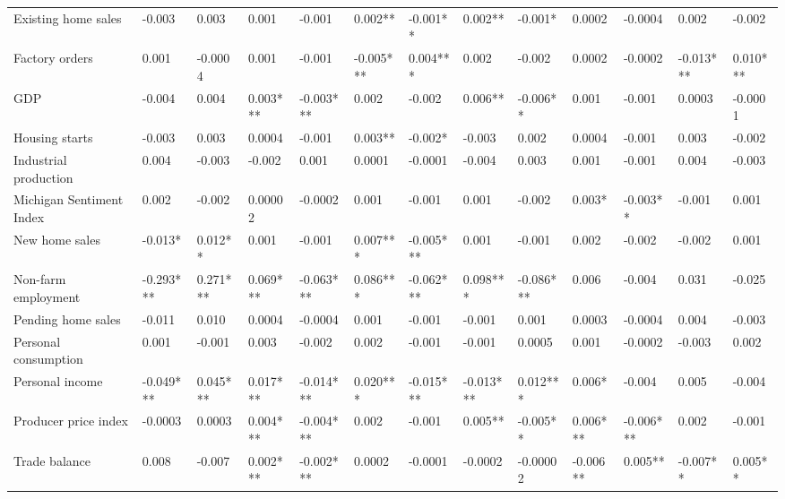 \begin{landscape}
\begin{table}[]
{\begin{tabular}{lllllllllllll}
Existing home sales      & -0.003    & 0.003    & 0.001    & -0.001    & 0.002**   & -0.001**  & 0.002**   & -0.001*   & 0.0002   & -0.0004   & 0.002     & -0.002   \\
Factory orders           & 0.001     & -0.0004  & 0.001    & -0.001    & -0.005*** & 0.004***  & 0.002     & -0.002    & 0.0002   & -0.0002   & -0.013*** & 0.010*** \\
GDP                      & -0.004    & 0.004    & 0.003*** & -0.003*** & 0.002     & -0.002    & 0.006**   & -0.006**  & 0.001    & -0.001    & 0.0003    & -0.0001  \\
Housing starts           & -0.003    & 0.003    & 0.0004   & -0.001    & 0.003**   & -0.002*   & -0.003    & 0.002     & 0.0004   & -0.001    & 0.003     & -0.002   \\
Industrial production    & 0.004     & -0.003   & -0.002   & 0.001     & 0.0001    & -0.0001   & -0.004    & 0.003     & 0.001    & -0.001    & 0.004     & -0.003   \\
Michigan Sentiment Index & 0.002     & -0.002   & 0.00002  & -0.0002   & 0.001     & -0.001    & 0.001     & -0.002    & 0.003*   & -0.003**  & -0.001    & 0.001    \\
New home sales           & -0.013*   & 0.012**  & 0.001    & -0.001    & 0.007***  & -0.005*** & 0.001     & -0.001    & 0.002    & -0.002    & -0.002    & 0.001    \\
Non-farm employment      & -0.293*** & 0.271*** & 0.069*** & -0.063*** & 0.086***  & -0.062*** & 0.098***  & -0.086*** & 0.006    & -0.004    & 0.031     & -0.025   \\
Pending home sales       & -0.011    & 0.010    & 0.0004   & -0.0004   & 0.001     & -0.001    & -0.001    & 0.001     & 0.0003   & -0.0004   & 0.004     & -0.003   \\
Personal consumption     & 0.001     & -0.001   & 0.003    & -0.002    & 0.002     & -0.001    & -0.001    & 0.0005    & 0.001    & -0.0002   & -0.003    & 0.002    \\
Personal income          & -0.049*** & 0.045*** & 0.017*** & -0.014*** & 0.020***  & -0.015*** & -0.013*** & 0.012***  & 0.006*   & -0.004    & 0.005     & -0.004   \\
Producer price index     & -0.0003   & 0.0003   & 0.004*** & -0.004*** & 0.002     & -0.001    & 0.005**   & -0.005**  & 0.006*** & -0.006*** & 0.002     & -0.001   \\
Trade balance            & 0.008     & -0.007   & 0.002*** & -0.002*** & 0.0002    & -0.0001   & -0.0002   & -0.00002  & -0.006** & 0.005**   & -0.007**  & 0.005**  \\ \hline

\end{tabular}}
\end{table}
\end{landscape}
